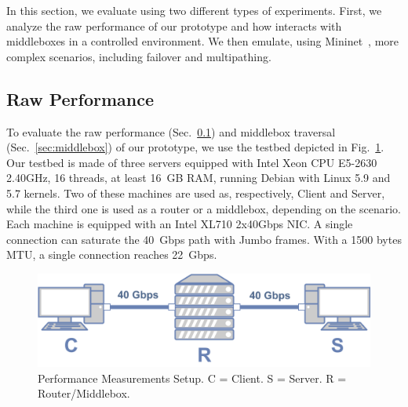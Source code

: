 
In this section, we evaluate \tcpls using two different types of experiments.
First, we analyze the raw performance of our \tcpls prototype and how \tcpls
interacts with middleboxes in a controlled environment. We then emulate, using
Mininet~\cite{handigol2012reproducible}, more complex scenarios, including failover and multipathing.






\subsection{Raw Performance} \label{sec:perf}

To evaluate the raw performance (Sec.~\ref{sec:perf}) and middlebox traversal
(Sec.~\ref{sec:middlebox}) of our \tcpls prototype, we use the testbed depicted
in Fig.~\ref{fig:perf_testbed}. Our testbed is made of three servers equipped
with Intel Xeon CPU E5-2630 2.40GHz, 16 threads, at least 16~GB RAM, running
Debian with Linux 5.9 and 5.7 kernels. Two of these machines are used as,
respectively, Client and Server, while the third one is used as a router or a
middlebox, depending on the scenario. Each machine is equipped with an Intel
XL710 2x40Gbps NIC. A single \tcp connection can saturate the 40~Gbps path with
Jumbo frames. With a 1500 bytes MTU, a single connection reaches 22~Gbps.

\begin{figure}[!t]
  \begin{center}
    \includegraphics[width=.6\columnwidth]{figures/testbed.png}
  \end{center}
  \vspace{-0.5cm}
  \caption{Performance Measurements Setup. C = Client. S = Server. R = Router/Middlebox.}
  \label{fig:perf_testbed}
\end{figure}


